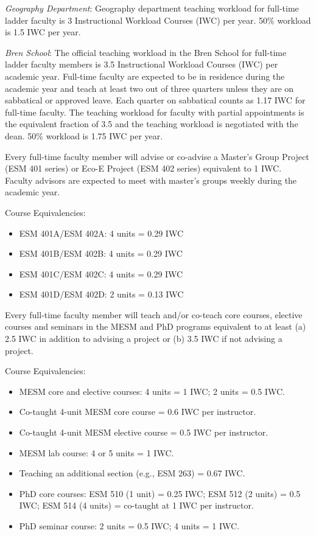 \documentclass[10pt]{article}
\begin{document}
\begin{enumerate}
{\footnotesize

\item {\em Geography Department}: Geography department teaching workload for full-time ladder faculty is 3 Instructional Workload Courses (IWC) per year. 50\% workload is 1.5 IWC per year.

\item {\em Bren School}:  The official teaching workload in the Bren School for full-time ladder faculty members is 3.5 Instructional Workload Courses (IWC) per academic year. Full-time faculty are expected to be in residence during the academic year and teach at least two out of three quarters unless they are on sabbatical or approved leave. Each quarter on sabbatical counts as 1.17 IWC for full-time faculty. The teaching workload for faculty with partial appointments is the equivalent fraction of 3.5 and the teaching workload is negotiated with the dean. 50\% workload is 1.75 IWC per year.

Every full-time faculty member will advise or co-advise a Master’s Group Project (ESM 401 series) or Eco-E Project (ESM 402 series) equivalent to 1 IWC. Faculty advisors are expected to meet with master’s groups weekly during the academic year.

Course Equivalencies:
\begin{itemize}
    \item ESM 401A/ESM 402A: 4 units = 0.29 IWC 
    \item ESM 401B/ESM 402B: 4 units = 0.29 IWC
    \item ESM 401C/ESM 402C: 4 units = 0.29 IWC
    \item ESM 401D/ESM 402D: 2 units = 0.13 IWC
\end{itemize}

Every full-time faculty member will teach and/or co-teach core courses, elective courses and seminars in the MESM and PhD programs equivalent to at least (a) 2.5 IWC in addition to advising a project or (b) 3.5 IWC if not advising a project. 

Course Equivalencies:
\begin{itemize}
    \item MESM core and elective courses: 4 units = 1 IWC; 2 units = 0.5 IWC.
    \item Co-taught 4-unit MESM core course = 0.6 IWC per instructor.
    \item Co-taught 4-unit MESM elective course = 0.5 IWC per instructor.
    \item MESM lab course: 4 or 5 units = 1 IWC.
    \item Teaching an additional section (e.g., ESM 263) = 0.67 IWC.
    \item PhD core courses: ESM 510 (1 unit) = 0.25 IWC; ESM 512 (2 units) = 0.5 IWC; ESM 514 (4 units) = co-taught at 1 IWC per instructor.
    \item PhD seminar course: 2 units = 0.5 IWC; 4 units = 1 IWC.
\end{itemize}

}
\end{enumerate}
\end{document}
